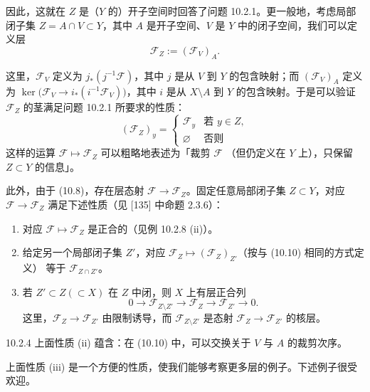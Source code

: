 因此，这就在 $Z$ 是（$Y$ 的）开子空间时回答了问题 10.2.1。更一般地，考虑局部闭子集
$Z=A\cap V\subset Y$，其中 $A$ 是开子空间、$V$ 是 $Y$ 中的闭子空间，我们可以定义层
\begin{equation}\tag{10.10}
  \mathcal{F}_Z:=(\mathcal{F}_V)_A.
\end{equation}

这里，$\mathcal{F}_V$ 定义为 $j_\ast(j^{-1}\mathcal{F})$，其中 $j$ 是从 $V$ 到
$Y$ 的包含映射；而 $(\mathcal{F}_V)_A$ 定义为
$\ker\bigl(\mathcal{F}_V\to i_\ast(i^{-1}\mathcal{F}_V)\bigr)$，其中 $i$ 是从
$X\setminus A$ 到 $Y$ 的包含映射。于是可以验证 $\mathcal{F}_Z$ 的茎满足问题 10.2.1
所要求的性质：
\[
  (\mathcal{F}_Z)_y=\begin{cases}
    \mathcal{F}_y & \text{若 } y\in Z,\\
    \varnothing & \text{否则}
  \end{cases}
\]
这样的运算 $\mathcal{F}\mapsto\mathcal{F}_Z$ 可以粗略地表述为「裁剪 $\mathcal{F}$
（但仍定义在 $Y$ 上），只保留 $Z\subset Y$ 的信息」。

此外，由于 (10.8)，存在层态射 $\mathcal{F}\to\mathcal{F}_Z$。固定任意局部闭子集
$Z\subset Y$，对应 $\mathcal{F}\to\mathcal{F}_Z$ 满足下述性质（见 [135] 中命题
2.3.6）：
\begin{enumerate}[label=(\roman*)]
  \item 对应 $\mathcal{F}\mapsto\mathcal{F}_Z$ 是正合的（见例 10.2.8 (ii)）。
  \item 给定另一个局部闭子集 $Z'$，对应
        $\mathcal{F}_Z\mapsto(\mathcal{F}_Z)_{Z'}$（按与 (10.10) 相同的方式定义）
        等于 $\mathcal{F}_{Z\cap Z'}$。
  \item 若 $Z'\subset Z(\subset X)$ 在 $Z$ 中闭，则 $X$ 上有层正合列
        \begin{equation}\tag{10.11}
          0\to\mathcal{F}_{Z\setminus Z'}\to\mathcal{F}_Z\to\mathcal{F}_{Z'}\to0.
        \end{equation}
        这里，$\mathcal{F}_Z\to\mathcal{F}_{Z'}$ 由限制诱导，而
        $\mathcal{F}_{Z\setminus Z'}$ 是态射 $\mathcal{F}_Z\to\mathcal{F}_{Z'}$
        的核层。
\end{enumerate}

\begin{wrem}{10.2.4}
  上面性质 (ii) 蕴含：在 (10.10) 中，可以交换关于 $V$ 与 $A$ 的裁剪次序。
\end{wrem}

上面性质 (iii) 是一个方便的性质，使我们能够考察更多层的例子。下述例子很受欢迎。

